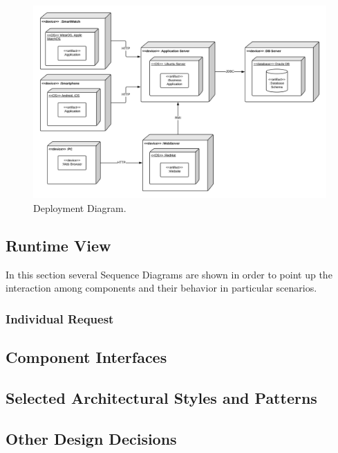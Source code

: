 \begin{figure}[H]
\centering
\includegraphics[scale=0.35]{Images/DeploymentDiagram.png}
\caption{Deployment Diagram.}
\end{figure}

\subsection{Runtime View}
In this section several Sequence Diagrams are shown in order to point up the interaction among components and their behavior in particular scenarios.

\subsubsection{Individual Request}

\subsubsection{}
\subsubsection{}


\subsection{Component Interfaces}
\subsection{Selected Architectural Styles and Patterns}
\subsection{Other Design Decisions}
